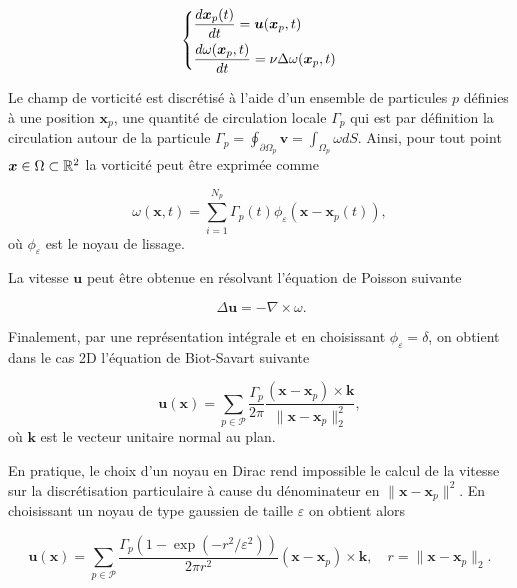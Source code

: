 \begin{gather*}
    \left\{\begin{aligned}
         & \frac{d \bm{x}_p(t)}{dt} = \bm u(\bm{x}_p, t)                    \\
         & \frac{d\omega(\bm{x}_p, t)}{dt} = \nu \Delta \omega(\bm{x}_p, t)
    \end{aligned} \right.
\end{gather*}

Le champ de vorticité est discrétisé à l'aide d'un ensemble de particules $p$ définies à une position $\bm x_p$, une quantité de circulation locale $\Gamma_p$ qui est par définition la circulation autour de la particule $\Gamma_p = \oint_{\partial \Omega_p} \bm v = \int_{\Omega_p} \omega dS$. Ainsi, pour tout point $\bm{x} \in \Omega \subset \mathbb R^2$ la vorticité peut être exprimée comme

\begin{equation*}
    \omega(\bm x, t) = \sum_{i=1}^{N_p} \Gamma_p(t) \phi_\varepsilon(\bm x - \bm x_p(t)),
\end{equation*}où $\phi_\varepsilon$ est le noyau de lissage.

La vitesse $\bm u$ peut être obtenue en résolvant l'équation de Poisson suivante

\begin{equation*}~\label{eq:poisson}
    \Delta \bm u = - \nabla \times \omega.
\end{equation*}

Finalement, par une représentation intégrale et en choisissant $\phi_\varepsilon = \delta$, on obtient dans le cas 2D l'équation de Biot-Savart suivante

\begin{equation*}
    \bm u(\bm x) = \sum_{p \in \mathcal P} \frac{\Gamma_p}{2\pi} \frac{(\bm x - \bm x_p)\times \bm k}{\|\bm x - \bm x_p\|_2^2},
\end{equation*}où $\bm k$ est le vecteur unitaire normal au plan.

En pratique, le choix d'un noyau en Dirac rend impossible le calcul de la vitesse sur la discrétisation particulaire à cause du dénominateur en ${\|\bm x - \bm x_p\|^2}$. En choisissant un noyau de type gaussien de taille $\varepsilon$ on obtient alors

\begin{equation*}
    \bm u(\bm x) = \sum_{p \in \mathcal P} \frac{\Gamma_p(1 - \exp(-r^2 / \varepsilon^2)) }{2\pi r^2} (\bm x - \bm x_p)\times \bm k, \quad r = \|\bm x - \bm x_p\|_2.
\end{equation*}

